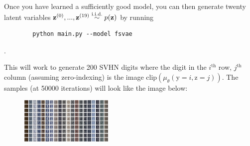 \begin{enumerate}[label=(\alph*)]
    Once you have learned a sufficiently good model, you can then generate twenty latent variables $\mathbf{z}^{(0)},...,\mathbf{z}^{(19)} \overset{\text{i.i.d.}}{\sim} p(\mathbf{z})$ 
    by running 
    \begin{verbatim}
        python main.py --model fsvae
    \end{verbatim}. 
    
    This will work to generate 200 SVHN digits where the digit in the $i^{\text{th}}$ row, $j^{\text{th}}$ column 
    (assuming zero-indexing) is the image $\text{clip}(\mu_{\theta}(\text{y} = i,\text{z} = j))$. The samples (at 50000 iterations) will look like the image below:

    \begin{figure}[h]
        \centering
        \includegraphics[width=0.4\textwidth]{./figures/fsvae_gen}
    \end{figure}

\end{enumerate}
